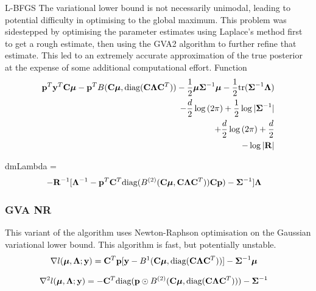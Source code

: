 \documentclass{article}[12pt]
\begin{document}

L-BFGS
The variational lower bound is not necessarily unimodal, leading to potential
difficulty in optimising to the global maximum. This problem was sidestepped by
optimising the parameter estimates using Laplace's method first to get a rough
estimate, then using the GVA2 algorithm to further refine that estimate. This led
to an extremely accurate approximation of the true posterior at the expense of some
additional computational effort.
Function
\begin{align*}
{\bf p}^T{\bf y}^T{\bf C} {\boldsymbol \mu} - {\bf p}^T B({\bf C} {\boldsymbol \mu}, \text{diag}({\bf C} {\boldsymbol \Lambda} {\bf C}^T)) - {\frac{1}{2}} {\boldsymbol \mu} {\boldsymbol \Sigma}^{-1} {\boldsymbol \mu} - {\frac{1}{2}} \text{tr}{({\boldsymbol\Sigma}^{-1} {\boldsymbol\Lambda})} \\
- \frac{d}{2} \log{(2 \pi)} + {\frac{1}{2}} \log{|{\boldsymbol\Sigma}^{-1}|} \\
+ \frac{d}{2} \log{(2 \pi)} + \frac{d}{2} \\
- \log{|{\bf R}|}
\end{align*}

dmLambda =
\begin{align*}
-{\bf R}^{-1}[{\boldsymbol \Lambda}&^{-1} - {\bf p}^T {\bf C}^T \text{diag}(B^{(2)}({\bf C} {\boldsymbol \mu}, {\bf C} {\boldsymbol \Lambda} {\bf C}^T)) {\bf C} {\bf p}) - {\boldsymbol \Sigma}^{-1}]{\boldsymbol\Lambda}
\end{align*} 

\subsubsection{GVA NR}
This variant of the algorithm uses Newton-Raphson optimisation on the Gaussian
variational lower bound. This algorithm is fast, but potentially unstable.
\begin{align*}
\nabla l({\boldsymbol \mu}, {\boldsymbol \Lambda}; {\bf y}) &= {\bf C}^T{\bf p}[{\bf y} - B^{1}({\bf C} {\boldsymbol \mu}, \text{diag}({\bf C} {\boldsymbol \Lambda} {\bf C}^T))] - {\boldsymbol \Sigma}^{-1} {\boldsymbol \mu}
\end{align*}

\begin{align*}
\nabla^2 l({\boldsymbol \mu}, {\boldsymbol \Lambda}; {\bf y}) &= -{\bf C}^T \text{diag}({\bf p} \odot B^{(2)}({\bf C} {\boldsymbol \mu}, \text{diag}({\bf C} {\boldsymbol \Lambda} {\bf C}^T))) - {\boldsymbol \Sigma}^{-1}
\end{align*}
\end{document}
